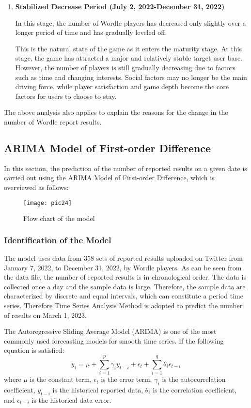 \documentclass[12pt]{article}  %
\begin{document}
\begin{enumerate}[\bfseries 1.]
	\item \textbf{Stabilized Decrease Period (July 2, 2022-December 31, 2022)}
	
	In this stage, the number of Wordle players has decreased only slightly over a longer period of time and has gradually leveled off. 
	
	This is the natural state of the game as it enters the maturity stage. At this stage, the game has attracted a major and relatively stable target user base. However, the number of players is still gradually decreasing due to factors such as time and changing interests. Social factors may no longer be the main driving force, while player satisfaction and game depth become the core factors for users to choose to stay.
\end{enumerate}

The above analysis also applies to explain the reasons for the change in the number of Wordle report results.

\subsection{ARIMA Model of First-order Difference}
In this section, the prediction of the number of reported results on a given date is carried out using the ARIMA Model of First-order Difference, which is overviewed as follows:

\begin{figure}[htbp]  %
	\centering  %
	\texttt{[image: pic24]} %
	\caption{Flow chart of the model}  
	\label{pic24}
\end{figure}
\vspace{-0.5cm}
\subsubsection{Identification of the Model}
The model uses data from 358 sets of reported results uploaded on Twitter from January 7, 2022, to December 31, 2022, by Wordle players. As can be seen from the data file, the number of reported results is in chronological order. The data is collected once a day and the sample data is large. Therefore, the sample data are characterized by discrete and equal intervals, which can constitute a period time series. Therefore Time Series Analysis Method is adopted to predict the number of results on March 1, 2023.

The Autoregressive Sliding Average Model (ARIMA) is one of the most commonly used forecasting models for smooth time series. If the following equation is satisfied:
\begin{equation}
	y_{\mathrm{t}}=\mu+\sum_{i=1}^p \gamma_i y_{t-i}+\epsilon_t+\sum_{i=1}^q \theta_i \epsilon_{t-i}
\end{equation}
where $\mu$ is the constant term, $\epsilon_t$ is the error term, $\gamma_i$ is the autocorrelation coefficient, $y_{t-i}$ is the historical reported data, $\theta_i$ is the correlation coefficient, and $\epsilon_{t-i}$ is the historical data error.
\end{document}
